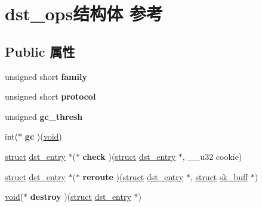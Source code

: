 \hypertarget{structdst__ops}{}\section{dst\+\_\+ops结构体 参考}
\label{structdst__ops}
\subsection*{Public 属性}
\begin{DoxyCompactItemize}
\item 
\mbox{\label{structdst__ops_a429d053a5866bd41481a7a4b260ff205}} 
unsigned short {\bfseries family}
\item 
\mbox{\label{structdst__ops_a654294148f9f559aaa7e9cb2385b18c5}} 
unsigned short {\bfseries protocol}
\item 
\mbox{\label{structdst__ops_abe359a47570b5eea5a4c03ce2204e3a2}} 
unsigned {\bfseries gc\+\_\+thresh}
\item 
\mbox{\label{structdst__ops_a85bbda434c614dec00e5c5a2126edff2}} 
int($\ast$ {\bfseries gc} )(\hyperlink{interfacevoid}{void})
\item 
\mbox{\label{structdst__ops_aa4830ac524741540cf1a4a0ab0fab9d1}} 
\hyperlink{interfacestruct}{struct} \hyperlink{structdst__entry}{dst\+\_\+entry} $\ast$($\ast$ {\bfseries check} )(\hyperlink{interfacestruct}{struct} \hyperlink{structdst__entry}{dst\+\_\+entry} $\ast$, \+\_\+\+\_\+u32 cookie)
\item 
\mbox{\label{structdst__ops_ab2a72f06ed3732a78bb1f7bd7c895f7d}} 
\hyperlink{interfacestruct}{struct} \hyperlink{structdst__entry}{dst\+\_\+entry} $\ast$($\ast$ {\bfseries reroute} )(\hyperlink{interfacestruct}{struct} \hyperlink{structdst__entry}{dst\+\_\+entry} $\ast$, \hyperlink{interfacestruct}{struct} \hyperlink{structsk__buff}{sk\+\_\+buff} $\ast$)
\item 
\mbox{\label{structdst__ops_aa88f6ef20a39b79070bdcc3cd68b355a}} 
\hyperlink{interfacevoid}{void}($\ast$ {\bfseries destroy} )(\hyperlink{interfacestruct}{struct} \hyperlink{structdst__entry}{dst\+\_\+entry} $\ast$)
\item 

\end{DoxyCompactItemize}
